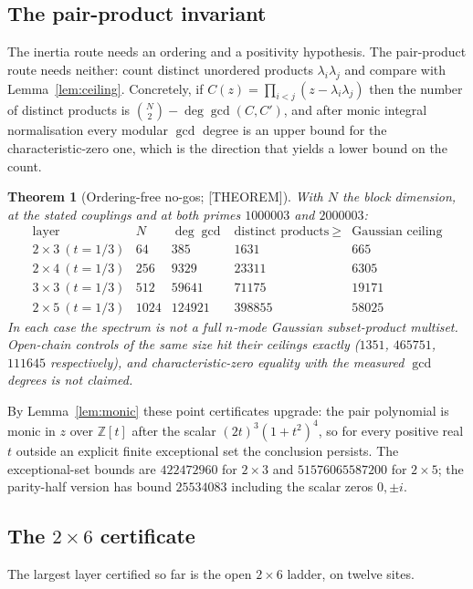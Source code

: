 \documentclass[11pt]{article}
\newtheorem{theorem}{Theorem}[section]
\theoremstyle{definition}
\newcommand{\Zb}{\mathbb{Z}}
\begin{document}
\subsection{The pair-product invariant}
The inertia route needs an ordering and a positivity hypothesis. The pair-product route needs
neither: count distinct unordered products $\lambda_i\lambda_j$ and compare with
Lemma~\ref{lem:ceiling}. Concretely, if $C(z)=\prod_{i<j}(z-\lambda_i\lambda_j)$ then the number of
distinct products is $\binom{N}{2}-\deg\gcd(C,C')$, and after monic integral normalisation every
modular $\gcd$ degree is an upper bound for the characteristic-zero one, which is the direction that
yields a lower bound on the count.

\begin{theorem}[Ordering-free no-gos; {[THEOREM]}]\label{thm:pairproducts}
With $N$ the block dimension, at the stated couplings and at both primes $1000003$ and $2000003$:
\[
\begin{array}{l|r|r|r|r}
\text{layer} & N & \deg\gcd & \text{distinct products}\ \ge & \text{Gaussian ceiling}\\ \hline
2\times3\ (t=1/3) & 64 & 385 & 1631 & 665\\
2\times4\ (t=1/3) & 256 & 9329 & 23311 & 6305\\
3\times3\ (t=1/3) & 512 & 59641 & 71175 & 19171\\
2\times5\ (t=1/3) & 1024 & 124921 & 398855 & 58025
\end{array}
\]
In each case the spectrum is not a full $n$-mode Gaussian subset-product multiset. Open-chain
controls of the same size hit their ceilings exactly ($1351$, $465751$, $111645$ respectively), and
characteristic-zero equality with the measured $\gcd$ degrees is \emph{not} claimed.
\end{theorem}

By Lemma~\ref{lem:monic} these point certificates upgrade: the pair polynomial is monic in $z$ over
$\Zb[t]$ after the scalar $(2t)^3(1+t^2)^4$, so for every positive real $t$ outside an explicit finite
exceptional set the conclusion persists. The exceptional-set bounds are $422472960$ for $2\times3$
and $51576065587200$ for $2\times5$; the parity-half version has bound $25534083$ including the
scalar zeros $0,\pm i$.

\subsection{The $2\times6$ certificate}\label{sec:2x6}
The largest layer certified so far is the open $2\times6$ ladder, on twelve sites.
\end{document}
